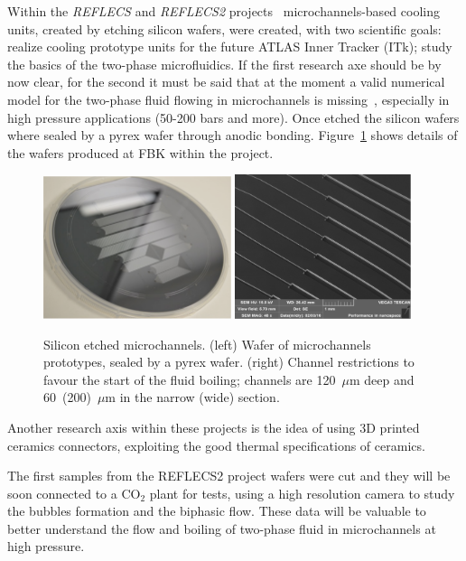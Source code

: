 Within the {\it REFLECS} and {\it REFLECS2} projects~\cite{REFLECS} microchannels-based cooling units, 
created by etching silicon wafers, were created, with two scientific goals: realize cooling prototype units 
for the future ATLAS Inner Tracker (ITk); study the basics of the two-phase microfluidics. If the first research 
axe should be by now clear, for the second it must be said that at the moment a valid numerical model for 
the two-phase fluid flowing in microchannels is missing~\cite{KIM201474}, especially in high pressure applications (50-200 
bars and more).
Once etched the silicon wafers where sealed by a pyrex wafer through anodic bonding. 
Figure~\ref{fig:reflecs} shows details of the wafers produced at FBK within the project. 
\begin{figure}[!htpb]
\centering
\includegraphics[width=0.49\textwidth]{Wafer.pdf}
\includegraphics[width=0.46\textwidth]{restrictions.pdf}
\caption{\label{fig:reflecs}Silicon etched microchannels. (left) Wafer of microchannels prototypes, 
sealed by a pyrex wafer. (right) Channel restrictions to favour the start of the fluid boiling; channels are 
120~$\mu$m deep and 60~(200)~$\mu$m in the narrow (wide) section.}
\end{figure}
Another research axis within these projects is the idea of using 3D printed ceramics connectors, 
exploiting the good thermal specifications of ceramics. 

The first samples from the REFLECS2 project wafers were cut and they will be soon connected 
to a CO$_2$ plant for tests, using a high resolution camera to study the bubbles formation and the 
biphasic flow. These data will be valuable to better understand the flow and boiling of two-phase fluid 
in microchannels at high pressure. 


